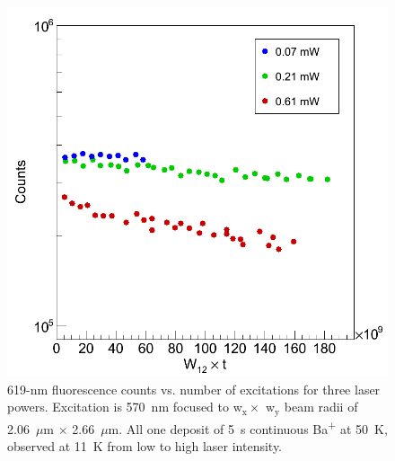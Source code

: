 
\begin{figure} %
        \centering
                \includegraphics[width=.5\textwidth]{figures/619_bleach_w12t_semilog.png}
                \caption{619-nm fluorescence counts vs. number of excitations for three laser powers.  Excitation is 570~nm focused to w$_{\text{x}} \times$ w$_{\text{y}}$ beam radii of 2.06~$\mu$m $\times$ 2.66~$\mu$m. All one deposit of 5~s continuous Ba\textsuperscript{+} at 50~K, observed at 11~K from low to high laser intensity.}
\label{fig:bleaching619}
\end{figure}




